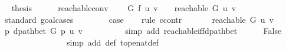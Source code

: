 \begin{isabellebody}
\ \isamarkupfalse%
\ {\isacharquery}{\kern0pt}thesis\isanewline
\ \ \ \ \isacommand{{\isachardot}{\kern0pt}}\isamarkupfalse%
\isanewline
{}\isamarkupfalse%
%
\endisatagproof
{\isafoldproof}%
%
\isadelimproof
\isanewline
%
\endisadelimproof
%
\isadeliminvisible
\isanewline
%
\endisadeliminvisible
%
\isataginvisible
{}\isamarkupfalse%
\ {\isasymdelta}{\isacharunderscore}{\kern0pt}reachable{\isacharunderscore}{\kern0pt}conv{\isacharcolon}{\kern0pt}\isanewline
\ \ \ {\isachardoublequoteopen}{\isasymdelta}\ G\ f\ u\ v\ {\isasymnoteq}\ {\isasyminfinity}\ {\isacharequal}{\kern0pt}\ reachable\ G\ u\ v{\isachardoublequoteclose}%
\endisataginvisible
{\isafoldinvisible}%
%
\isadeliminvisible
\isanewline
%
\endisadeliminvisible
%
\isadelimproof
%
\endisadelimproof
%
\isatagproof
{}\isamarkupfalse%
\ {\isacharparenleft}{\kern0pt}standard{\isacharcomma}{\kern0pt}\ goal{\isacharunderscore}{\kern0pt}cases{\isacharparenright}{\kern0pt}\isanewline
\ \ \isamarkupfalse%
\ {}\isanewline
\ \ \isamarkupfalse%
\ {\isacharquery}{\kern0pt}case\isanewline
\ \ \isamarkupfalse%
\ {\isacharparenleft}{\kern0pt}rule\ ccontr{\isacharparenright}{\kern0pt}\isanewline
\ \ \ \ \isamarkupfalse%
\ {\isachardoublequoteopen}{\isasymnot}\ reachable\ G\ u\ v{\isachardoublequoteclose}\isanewline
\ \ \ \ \isamarkupfalse%
\ {\isachardoublequoteopen}{\isacharbraceleft}{\kern0pt}p{\isachardot}{\kern0pt}\ dpath{\isacharunderscore}{\kern0pt}bet\ G\ p\ u\ v{\isacharbraceright}{\kern0pt}\ {\isacharequal}{\kern0pt}\ {\isacharbraceleft}{\kern0pt}{\isacharbraceright}{\kern0pt}{\isachardoublequoteclose}\isanewline
\ \ \ \ \ \ \isamarkupfalse%
\ {\isacharparenleft}{\kern0pt}simp\ add{\isacharcolon}{\kern0pt}\ reachable{\isacharunderscore}{\kern0pt}iff{\isacharunderscore}{\kern0pt}dpath{\isacharunderscore}{\kern0pt}bet{\isacharparenright}{\kern0pt}\isanewline
\ \ \ \ \isamarkupfalse%
\ {\isachardoublequoteopen}False{\isachardoublequoteclose}\isanewline
\ \ \ \ \ \ \isamarkupfalse%
\ {}\isanewline
\ \ \ \ \ \ \isamarkupfalse%
\ {\isacharparenleft}{\kern0pt}simp\ add{\isacharcolon}{\kern0pt}\ {\isasymdelta}{\isacharunderscore}{\kern0pt}def\ top{\isacharunderscore}{\kern0pt}enat{\isacharunderscore}{\kern0pt}def{\isacharparenright}{\kern0pt}\isanewline
\ \ \isamarkupfalse%
\isanewline
{}\isamarkupfalse%
\isanewline
\ \ \isamarkupfalse%

\end{isabellebody}
